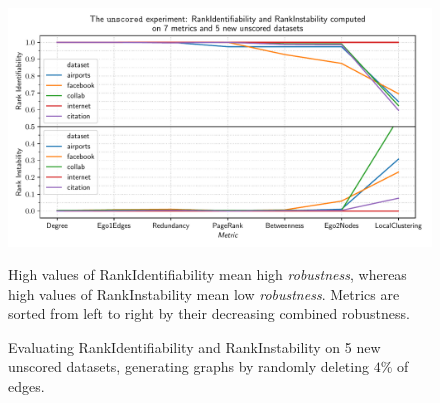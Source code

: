 \begin{figure}
    \includegraphics[width=\linewidth]{plot_unscored.pdf}
    \caption{Evaluating RankIdentifiability and RankInstability on 5 new unscored datasets, generating graphs by randomly deleting $4\%$ of edges.}
    \label{fig:plot_unscored}
    \footnotesize
    \begin{flushleft}
        High values of RankIdentifiability mean high \textsl{robustness}, whereas high values of RankInstability mean low \textsl{robustness}.
        Metrics are sorted from left to right by their decreasing combined robustness.
    \end{flushleft}
\end{figure}
